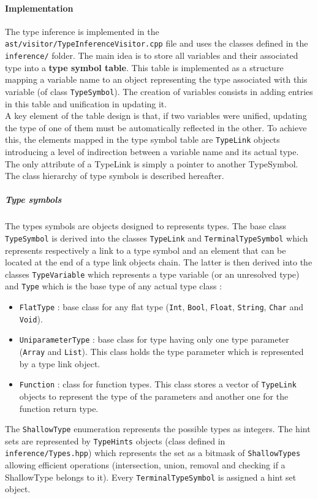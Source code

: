 \documentclass[a4paper,11pt]{article}
\begin{document}
\paragraph{Implementation} The type inference is implemented in the \texttt{ast/visitor/TypeInferenceVisitor.cpp} file and uses the classes defined in the \texttt{inference/} folder. The main idea is to store all variables and their associated type into a \textbf{type symbol table}. This table is implemented as a structure mapping a variable name to an object representing the type associated with this variable (of class \texttt{TypeSymbol}). The creation of variables consists in adding entries in this table and unification in updating it. \\
A key element of the table design is that, if two variables were unified, updating the type of one of them must be automatically reflected in the other. To achieve this, the elements mapped in the type symbol table are \texttt{TypeLink} objects introducing a level of indirection between a variable name and its actual type. The only attribute of a TypeLink is simply a pointer to another TypeSymbol. The class hierarchy of type symbols is described hereafter.
\subparagraph{Type symbols} The types symbols are objects designed to represents types. The base class \texttt{TypeSymbol} is derived into the classes \texttt{TypeLink} and \texttt{TerminalTypeSymbol} which represents respectively a link to a type symbol and an element that can be located at the end of a type link objects chain. The latter is then derived into the classes \texttt{TypeVariable} which represents a type variable (or an unresolved type) and \texttt{Type} which is the base type of any actual type class :
\begin{itemize}
	\item \texttt{FlatType} : base class for any flat type (\texttt{Int}, \texttt{Bool}, \texttt{Float}, \texttt{String}, \texttt{Char} and \texttt{Void}).
	\item \texttt{UniparameterType} : base class for type having only one type parameter (\texttt{Array} and \texttt{List}). This class holds the type parameter which is represented by a type link object.
	\item \texttt{Function} : class for function types. This class stores a vector of \texttt{TypeLink} objects to represent the type of the parameters and another one for the function return type.
\end{itemize}
The \texttt{ShallowType} enumeration represents the possible types as integers. The hint sets are represented by \texttt{TypeHints} objects (class defined in \texttt{inference/Types.hpp}) which represents the set as a bitmask of \texttt{ShallowTypes} allowing efficient operations (intersection, union, removal and checking if a ShallowType belongs to it). Every \texttt{TerminalTypeSymbol} is assigned a hint set object.
\end{document}
